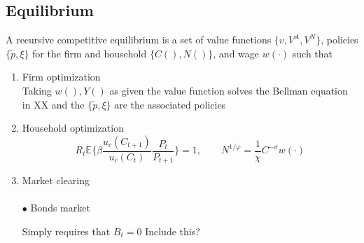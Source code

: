 \documentclass[a4paper,10pt]{article}  %
\begin{document}
\subsection{Equilibrium} %
\label{sub:equilibrium}

\begin{equil}
   A recursive competitive equilibrium is a set of value functions $ \Big\{ v, V^A, V^{N} \Big\} $,
   policies $ \{ \tilde{p}, \xi \} $ for the firm and household $ \Big\{ C( ), N( ) \Big\} $, 
   and wage $ w(\cdot) $ such that
   \begin{enumerate}
      
      \item Firm optimization \\
      Taking $ w(),Y() $ as given the value function solves the Bellman equation in XX and
      the $ \{ \tilde{p}, \xi \} $ are the associated policies

      \item Household optimization \\
      \[
         R_t \mathbb{E} \bigg\{ \beta \frac{ u_c( C_{t+1} ) }{ u_c(C_t) } \frac{ P_{t} }{ P_{t+1} } \bigg\} = 1 , 
         \qquad
         N^{1/\varphi} = \frac{1}{\chi} C^{-\sigma}  w( \cdot )
      \]

      \item Market clearing \\ \ \\
      
      $\bullet $ Bonds market
      
      \hspace{1em} Simply requires that $ B_t = 0 $ {\color{RubineRed} Include this?}


\end{enumerate}
\end{equil}
\end{document}
